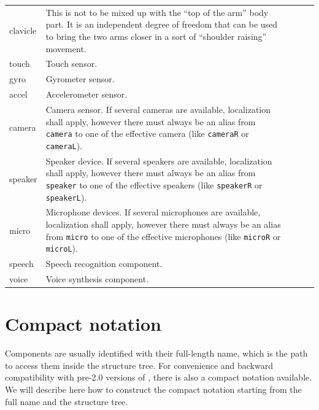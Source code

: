 \begin{center}
\begin{supertabular}{|m{2.312cm}|m{6.776cm}|m{2.629cm}|m{2.471cm}|m{2.1269999cm}|}
\code{{}-} \\\hline
clavicle &
This is not to be mixed up with the
“top of the arm” body part. It is an independent degree of freedom that
can be used to bring the two arms closer in a sort of “shoulder
raising” movement. &
 &
\code{{}-} &
 \\\hline
touch &
Touch sensor. &
 &
\code{{}-} &
 \\\hline
gyro &
Gyrometer sensor. &
 &
\code{{}-} &
 \\\hline
accel  &
Accelerometer sensor. &
 &
\code{{}-} &
 \\\hline
camera &
Camera sensor. If several cameras are
available, localization shall apply, however there must always be an
alias from \texttt{camera} to one of the effective camera (like
\texttt{cameraR} or \texttt{cameraL}). &
 &
\code{{}-} &
 \\\hline
speaker &
Speaker device. If several speakers
are available, localization shall apply, however there must always be
an alias from \texttt{speaker} to one of the effective speakers (like
\texttt{speakerR} or \texttt{speakerL}). &
 &
\code{{}-} &
 \\\hline
micro  &
Microphone devices. If several
microphones are available, localization shall apply, however there must
always be an alias from \texttt{micro} to one of the effective
microphones (like \texttt{microR} or \texttt{microL}). &
 &
\code{{}-} &
 \\\hline
speech &
Speech recognition component. &
 &
\code{{}-} &
 \\\hline
voice &
Voice synthesis component. &
 &
\code{{}-} &
 \\\hline
\end{supertabular}
\end{center}


\section{Compact notation}

Components are usually identified with their full-length name, which is
the path to access them inside the structure tree. For convenience and
backward compatibility with pre-2.0 versions of \urbi, there is also a
compact notation available. We will describe here how to construct the
compact notation starting from the full name and the structure tree.

